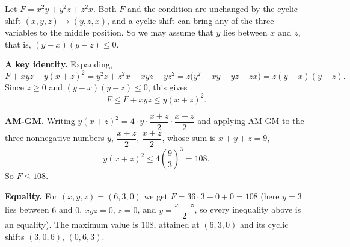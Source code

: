 Let $F=x^2y+y^2z+z^2x$. Both $F$ and the condition are unchanged by the cyclic shift $(x,y,z)\to(y,z,x)$, and a cyclic shift can bring any of the three variables to the middle position. So we may assume that $y$ lies between $x$ and $z$, that is, $(y-x)(y-z)\le0$.

\textbf{A key identity.} Expanding,
\[F+xyz-y(x+z)^2=y^2z+z^2x-xyz-yz^2=z\bigl(y^2-xy-yz+zx\bigr)=z(y-x)(y-z).\]
Since $z\ge0$ and $(y-x)(y-z)\le0$, this gives
\[F\le F+xyz\le y(x+z)^2.\]

\textbf{AM-GM.} Writing $y(x+z)^2=4\cdot y\cdot\dfrac{x+z}{2}\cdot\dfrac{x+z}{2}$ and applying AM-GM to the three nonnegative numbers $y$, $\dfrac{x+z}{2}$, $\dfrac{x+z}{2}$, whose sum is $x+y+z=9$,
\[y(x+z)^2\le4\left(\dfrac{9}{3}\right)^3=108.\]
So $F\le108$.

\textbf{Equality.} For $(x,y,z)=(6,3,0)$ we get $F=36\cdot3+0+0=108$ (here $y=3$ lies between $6$ and $0$, $xyz=0$, $z=0$, and $y=\dfrac{x+z}{2}$, so every inequality above is an equality). The maximum value is $\boxed{108}$, attained at $(6,3,0)$ and its cyclic shifts $(3,0,6)$, $(0,6,3)$.
